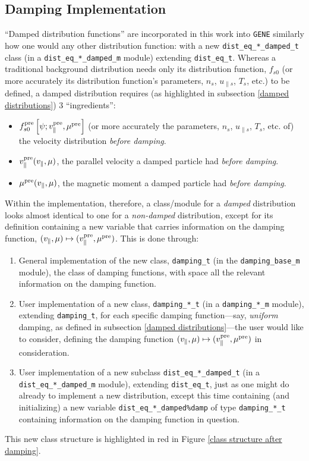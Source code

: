 \subsection{Damping Implementation}\label{damping implementation}
    ``Damped distribution functions'' are incorporated in this work into {\tt GENE} similarly how one would any other distribution function: with a new {\tt dist\_eq\_*\_damped\_t} class (in a {\tt dist\_eq\_*\_damped\_m} module) extending {\tt dist\_eq\_t}. Whereas a traditional background distribution needs only its distribution function, $f_{s0}$ (or more accurately its distribution function's parameters, $n_{s}$, $u_{\parallel s}$, $T_{s}$, etc.) to be defined, a damped distribution requires (as highlighted in subsection \ref{damped distributions}) 3 ``ingredients'':
    \begin{itemize}
        \item  $f_{s0}^{\rm pre}\left[\psi; v_{\parallel}^{\rm pre}, \mu^{\rm pre}\right]$ (or more accurately the parameters, $n_{s}$, $u_{\parallel s}$, $T_{s}$, etc. of) the velocity distribution \emph{before damping}.
        \item  $v_{\parallel}^{\rm pre}(v_{\parallel}, \mu)$, the parallel velocity a damped particle had \emph{before damping}.
        \item  $\mu^{\rm pre}(v_{\parallel}, \mu)$, the magnetic moment a damped particle had \emph{before damping}.
    \end{itemize}
    Within the implementation, therefore, a class/module for a \emph{damped} distribution looks almost identical to one for a \emph{non-damped} distribution, except for its definition containing a new variable that carries information on the damping function, $(v_{\parallel}, \mu)  \mapsto  (v_{\parallel}^{\rm pre}, \mu^{\rm pre})$. This is done through:
    \begin{enumerate}
        \item  General implementation of the new class, {\tt damping\_t} (in the {\tt damping\_base\_m} module), the class of damping functions, with space all the relevant information on the damping function.
        \item  User implementation of a new class, {\tt damping\_*\_t} (in a {\tt damping\_*\_m} module), extending {\tt damping\_t}, for each specific damping function—say, \emph{uniform} damping, as defined in subsection \ref{damped distributions}—the user would like to consider, defining the damping function $(v_{\parallel}, \mu)  \mapsto  (v_{\parallel}^{\rm pre}, \mu^{\rm pre})$ in consideration.
        \item  User implementation of a new subclass {\tt dist\_eq\_*\_damped\_t} (in a {\tt dist\_eq\_*\_damped\_m} module), extending {\tt dist\_eq\_t}, just as one might do already to implement a new distribution, except this time containing (and initializing) a new variable {\tt dist\_eq\_*\_damped\%damp} of type {\tt damping\_*\_t} containing information on the damping function in question.
    \end{enumerate}
    This new class structure is highlighted in {\color{red!90} red} in Figure \ref{class structure after damping}.
    
